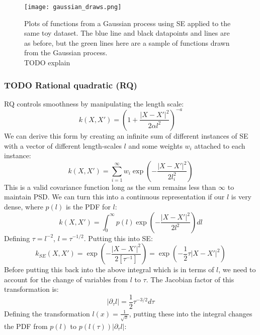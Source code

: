 \begin{figure}[H]
    \texttt{[image: gaussian\_draws.png]}
    \caption{
        Plots of functions from a Gaussian process using SE applied to the same toy dataset. The blue line and black datapoints and lines are as before, but the green lines here are a sample of functions drawn from the Gaussian process. \\
        TODO explain
    }
\end{figure}



\subsubsection{TODO Rational quadratic (RQ)}
RQ controls smoothness by manipulating the length scale:
\begin{equation*}
    k(X,X') = \left( 1 + \frac{|X - X'|^2}{2\alpha l^2} \right)^{-a}
\end{equation*}
We can derive this form by creating an infinite sum of different instances of SE with a vector of different length-scales $l$ and some weights $w_i$ attached to each instance:
\begin{equation*}
    k(X,X') = \sum_{i=1}^{\infty} w_i \exp \left( -\frac{|X - X'|^2}{2l_i^2} \right)
\end{equation*}
This is a valid covariance function long as the sum remains less than $\infty$ to maintain PSD. We can turn this into a continuous representation if our $l$ is very dense, where $p(l)$ is the PDF for $l$:
\begin{equation*}
    k(X,X') = \int_{0}^{\infty} p(l) \exp \left( -\frac{|X - X'|^2}{2l^2} \right) dl
\end{equation*}
Defining $\tau= l^{-2}$, $l = \tau^{-1/2}$. Putting this into SE:
\begin{equation*}
    k_{SE}(X,X') = \exp(-\frac{|X - X'|^2}{2[\tau^{-1}]}) = \exp(-\frac{1}{2} \tau |X - X'|^2)
\end{equation*}
Before putting this back into the above integral which is in terms of $l$, we need to account for the change of variables from $l$ to $\tau$. The Jacobian factor of this transformation is:
\begin{equation*}
    | \partial_{\tau} l | = \frac{1}{2} \tau^{-3/2} d\tau
\end{equation*}
Defining the transformation $l(x) = \frac{1}{\sqrt{x}}$, putting these into the integral changes the PDF from $p(l)$ to $p(l(\tau)) | \partial_{\tau}l |$:
